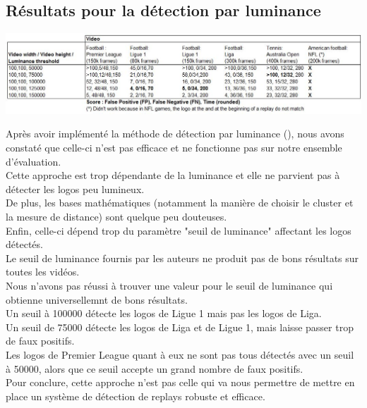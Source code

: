 \documentclass[11pt]{article}
\begin{document}
\subsection{Résultats pour la détection par luminance}
\label{sec:org98ae323}
\begin{center}
\includegraphics[width=15cm]{robust_res.JPG}
\end{center}
Après avoir implémenté la méthode de détection par luminance (\cite{xu11_robus_replay_detec_algor_soccer_video}), nous avons constaté que celle-ci n'est pas efficace et ne fonctionne pas sur notre ensemble d'évaluation.\\
Cette approche est trop dépendante de la luminance et elle ne parvient pas à détecter les logos peu lumineux.\\
De plus, les bases mathématiques (notamment la manière de choisir le cluster et la mesure de distance) sont quelque peu douteuses.\\
Enfin, celle-ci dépend trop du paramètre "seuil de luminance" affectant les logos détectés.\\
Le seuil de luminance fournis par les auteurs ne produit pas de bons résultats sur toutes les vidéos.\\
Nous n'avons pas réussi à trouver une valeur pour le seuil de luminance qui obtienne universellemnt de bons résultats.\\
Un seuil à 100000 détecte les logos de Ligue 1 mais pas les logos de Liga.\\
Un seuil de 75000 détecte les logos de Liga et de Ligue 1, mais laisse passer trop de faux positifs.\\
Les logos de Premier League quant à eux ne sont pas tous détectés avec un seuil à 50000, alors que ce seuil accepte un grand nombre de faux positifs.\\

Pour conclure, cette approche n'est pas celle qui va nous permettre de mettre en place un système de détection de replays robuste et efficace.\\
\end{document}

